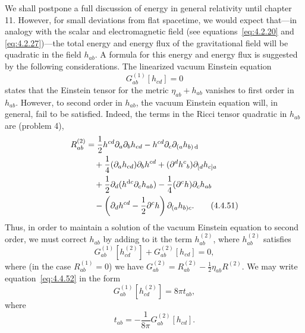 We shall postpone a full discussion of energy in general relativity until chapter 11.
However, for small deviations from flat spacetime, we would expect that---in
analogy with the scalar and electromagnetic field (see equations~\eqref{eq:4.2.20}
and \eqref{eq:4.2.27})---the total energy and energy flux of the gravitational field
will be quadratic in the field \(h_{ab}\). A formula for this energy and energy flux
is suggested by the following considerations. The linearized vacuum Einstein
equation
\begin{equation}
  G^{(1)}_{ab}[h_{cd}]=0
  \tag{4.4.50}\label{eq:4.4.50}
\end{equation}
states that the Einstein tensor for the metric \(\eta_{ab}+h_{ab}\) vanishes to first
order in \(h_{ab}\). However, to second order in \(h_{ab}\), the vacuum Einstein
equation will, in general, fail to be satisfied. Indeed, the terms in the Ricci tensor
quadratic in \(h_{ab}\) are (problem 4),
\begin{align}
  R^{(2)}_{ab}
    &=\frac12h^{cd}\partial_a\partial_bh_{cd}
      -h^{cd}\partial_c\partial_{(a}h_{b)\mathop{}\!\mathrm{d}}\notag\\
    &\quad+\frac14(\partial_ah_{cd})\partial_bh^{cd}
      +(\partial^dh^c{}_b)\partial_{[d}h_{c]a}\notag\\
    &\quad+\frac12\partial_d(h^{\mathop{}\!\mathrm{d} c}\partial_ch_{ab})
      -\frac14(\partial^ch)\partial_ch_{ab}\notag\\
    &\quad-\left(\partial_dh^{cd}-\frac12\partial^ch\right)
      \partial_{(a}h_{b)c} .
  \tag{4.4.51}\label{eq:4.4.51}
\end{align}
Thus, in order to maintain a solution of the vacuum Einstein equation to second
order, we must correct \(h_{ab}\) by adding to it the term \(h^{(2)}_{ab}\), where
\(h^{(2)}_{ab}\) satisfies
\begin{equation}
  G^{(1)}_{ab}[h^{(2)}_{cd}]+G^{(2)}_{ab}[h_{cd}]=0 ,
  \tag{4.4.52}\label{eq:4.4.52}
\end{equation}
where (in the case \(R^{(1)}_{ab}=0\)) we have
\(G^{(2)}_{ab}=R^{(2)}_{ab}-\tfrac12\eta_{ab}R^{(2)}\). We may write
equation~\eqref{eq:4.4.52} in the form
\begin{equation}
  G^{(1)}_{ab}[h^{(2)}_{cd}]=8\pi t_{ab} ,
  \tag{4.4.53}\label{eq:4.4.53}
\end{equation}
where
\begin{equation}
  t_{ab}=-\frac{1}{8\pi}G^{(2)}_{ab}[h_{cd}] .
  \tag{4.4.54}\label{eq:4.4.54}
\end{equation}

